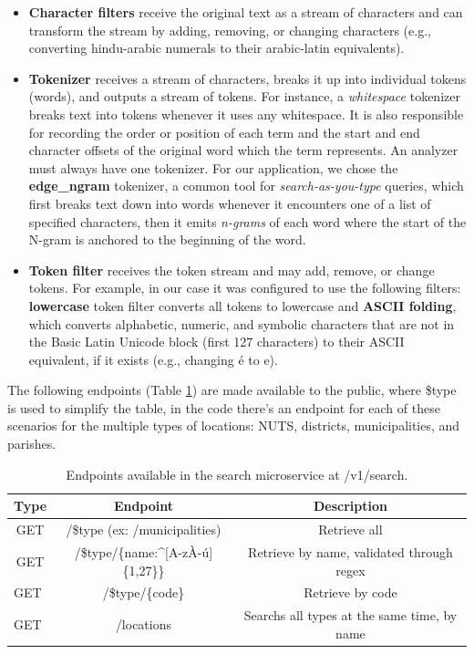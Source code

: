 \begin{itemize}
    \item \textbf{Character filters} receive the original text as a stream of characters and can transform the stream by adding, removing, or changing characters (e.g., converting hindu-arabic numerals to their arabic-latin equivalents).
    \item \textbf{Tokenizer} receives a stream of characters, breaks it up into individual tokens (words), and outputs a stream of tokens. For instance, a \textit{whitespace} tokenizer breaks text into tokens whenever it uses any whitespace. It is also responsible for recording the order or position of each term and the start and end character offsets of the original word which the term represents. An analyzer must always have one tokenizer. For our application, we chose the \textbf{edge\_ngram} tokenizer, a common tool for \textit{search-as-you-type} queries, which first breaks text down into words whenever it encounters one of a list of specified characters, then it emits \textit{\gls{n-gram}s} of each word where the start of the N-gram is anchored to the beginning of the word.  
    \item \textbf{Token filter} receives the token stream and may add, remove, or change tokens. For example, in our case it was configured to use the following filters: \textbf{lowercase} token filter converts all tokens to lowercase and \textbf{ASCII folding}, which converts alphabetic, numeric, and symbolic characters that are not in the Basic Latin Unicode block (first 127 characters) to their ASCII equivalent, if it exists (e.g., changing é to e).
\end{itemize}

The following endpoints (Table \ref{tbl:searchAPI}) are made available to the public, where \$type is used to simplify the table, in the code there's an endpoint for each of these scenarios for the multiple types of locations: NUTS, districts, municipalities, and parishes. 

\begin{table}[h]
\centering
\caption[Endpoints available in the search API]{Endpoints available in the search microservice at /v1/search.}
\begin{tabular}{c|c|c}
Type                     & Endpoint                                                & Description                                 \\ \hline
GET                      & /\$type (ex: /municipalities)                           & Retrieve all                                \\
GET                      & /\$type/\{name:\textasciicircum{}{[}A-zÀ-ú{]}\{1,27\}\} & Retrieve by name, validated through regex   \\
\multicolumn{1}{l|}{GET} & /\$type/\{code\}                                        & Retrieve by code                            \\
\multicolumn{1}{l|}{GET} & /locations                                              & Searchs all types at the same time, by name
\end{tabular}

\label{tbl:searchAPI}
\end{table}



